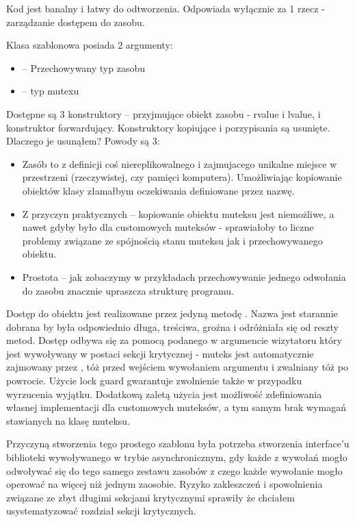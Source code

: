 
Kod jest banalny i łatwy do odtworzenia. Odpowiada wyłącznie za 1 rzecz - zarządzanie dostępem do zasobu.

Klasa szablonowa posiada 2 argumenty:
\begin{itemize}
\item {} -- Przechowywany typ zasobu
\item {} -- typ mutexu
\end{itemize}

Dostępne są 3 konstruktory -- przyjmujące obiekt zasobu - rvalue i lvalue, i konstruktor forwardujący. Konstruktory kopiujące i porzypisania są usunięte. Dlaczego je usunąłem? Powody są 3:
\begin{itemize}
\item Zasób to z definicji coś niereplikowalnego i zajmujacego unikalne miejsce w przestrzeni (rzeczywistej, czy pamięci komputera). Umożliwiając kopiowanie obiektów klasy  złamałbym oczekiwania definiowane przez nazwę.
\item Z przyczyn praktycznych -- kopiowanie obiektu muteksu jest niemożliwe, a nawet gdyby było dla customowych muteksów - sprawiałoby to liczne problemy związane ze spójnością stanu muteksu jak i przechowywanego obiektu.
\item Prostota -- jak zobaczymy w przykładach przechowywanie jednego odwołania do zasobu znacznie upraszcza strukturę programu.
\end{itemize}

Dostęp do obiektu jest realizowane przez jedyną metodę . Nazwa jest starannie dobrana by była odpowiednio długa, treściwa, groźna i odróżniała się od reszty metod. Dostęp odbywa się za pomocą podanego w argumencie wizytatoru który jest wywoływany w postaci sekcji krytycznej - muteks jest automatycznie zajmowany przez , tóż przed wejściem wywołaniem argumentu i zwalniany tóż po powrocie. Użycie lock guard gwarantuje zwolnienie także w przypadku wyrzucenia wyjątku. Dodatkową zaletą użycia  jest możliwość zdefiniowania własnej implementacji dla customowych muteksów, a tym samym brak wymagań stawianych na klasę muteksu.

Przyczyną stworzenia tego prostego szablonu była potrzeba stworzenia interface'u biblioteki wywoływanego w trybie asynchronicznym, gdy każde z wywołań mogło odwoływać się do tego samego zestawu zasobów z czego każde wywołanie mogło operować na więcej niż jednym zaosobie. Ryzyko zakleszczeń i spowolnienia związane ze zbyt długimi sekcjami krytycznymi sprawiły że chciałem usystematyzować rozdział sekcji krytycznych.
